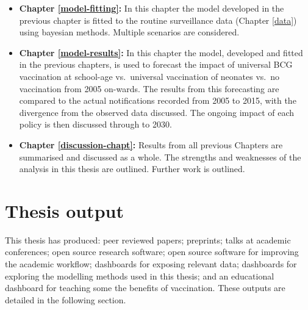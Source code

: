 \documentclass[11pt,twoside]{bristolthesis}
\begin{document}
\begin{itemize}
  \item
    \textbf{Chapter \ref{model-fitting}:} In this chapter the model developed in the previous chapter is fitted to the routine surveillance data (Chapter \ref{data}) using bayesian methods. Multiple scenarios are considered.
  \item
    \textbf{Chapter \ref{model-results}:} In this chapter the model, developed and fitted in the previous chapters, is used to forecast the impact of universal BCG vaccination at school-age vs.~universal vaccination of neonates vs.~no vaccination from 2005 on-wards. The results from this forecasting are compared to the actual notifications recorded from 2005 to 2015, with the divergence from the observed data discussed. The ongoing impact of each policy is then discussed through to 2030.
  \item
    \textbf{Chapter \ref{discussion-chapt}:} Results from all previous Chapters are summarised and discussed as a whole. The strengths and weaknesses of the analysis in this thesis are outlined. Further work is outlined.
  \end{itemize}
  \hypertarget{thesis-output}{%
  \section{Thesis output}\label{thesis-output}}
  
  This thesis has produced: peer reviewed papers; preprints; talks at academic conferences; open source research software; open source software for improving the academic workflow; dashboards for exposing relevant data; dashboards for exploring the modelling methods used in this thesis; and an educational dashboard for teaching some the benefits of vaccination. These outputs are detailed in the following section.
  
\end{document}
